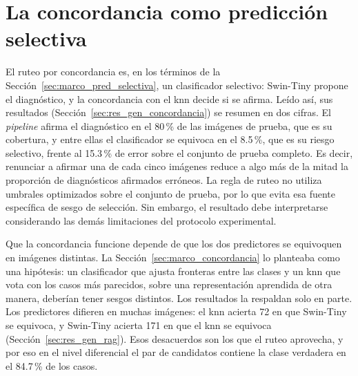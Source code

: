 \section{La concordancia como predicción selectiva}
\label{sec:disc_concordancia}

El ruteo por concordancia es, en los términos de la Sección~\ref{sec:marco_pred_selectiva}, un clasificador selectivo:
Swin-Tiny propone el diagnóstico, y la concordancia con el \gls{knn} decide si se afirma. Leído así, sus resultados
(Sección~\ref{sec:res_gen_concordancia}) se resumen en dos cifras. El \emph{pipeline} afirma el diagnóstico en el
80\,\% de las imágenes de prueba, que es su cobertura, y entre ellas el clasificador se equivoca en el 8.5\,\%, que es
su riesgo selectivo, frente al 15.3\,\% de error sobre el conjunto de prueba completo. Es decir, renunciar a afirmar una de cada
cinco imágenes reduce a algo más de la mitad la proporción de diagnósticos afirmados erróneos. La regla de ruteo no utiliza umbrales optimizados sobre el conjunto de prueba, por lo que evita esa fuente específica de sesgo de selección. Sin embargo, el resultado debe interpretarse considerando las demás limitaciones del protocolo experimental.

Que la concordancia funcione depende de que los dos predictores se equivoquen en imágenes distintas. La
Sección~\ref{sec:marco_concordancia} lo planteaba como una hipótesis: un clasificador que ajusta fronteras entre las
clases y un \gls{knn} que vota con los casos más parecidos, sobre una representación aprendida de otra manera, deberían
tener sesgos distintos. Los resultados la respaldan solo en parte. Los predictores difieren en muchas imágenes: el
\gls{knn} acierta 72 en que Swin-Tiny se equivoca, y Swin-Tiny acierta 171 en que el \gls{knn} se equivoca
(Sección~\ref{sec:res_gen_rag}). Esos desacuerdos son los que el ruteo aprovecha, y por eso en el nivel diferencial el
par de candidatos contiene la clase verdadera en el 84.7\,\% de los casos.

